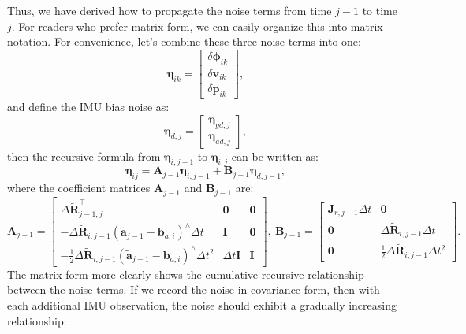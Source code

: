 Thus, we have derived how to propagate the noise terms from time $j-1$ to time $j$. For readers who prefer matrix form, we can easily organize this into matrix notation. For convenience, let's combine these three noise terms into one:
\begin{equation}\label{key}
	\boldsymbol{\eta}_{ik} = \begin{bmatrix}
		\delta \boldsymbol{\phi}_{ik} \\
		\delta \mathbf{v}_{ik} \\
		\delta \mathbf{p}_{ik}
	\end{bmatrix} ,
\end{equation}
and define the IMU bias noise as:
\begin{equation}\label{key}
	\boldsymbol{\eta}_{d,j} =\begin{bmatrix}
		\boldsymbol{\eta}_{gd, j} \\
		\boldsymbol{\eta}_{ad, j}
	\end{bmatrix},
\end{equation}
then the recursive formula from $\boldsymbol{\eta}_{i,j-1}$ to $\boldsymbol{\eta}_{i,j}$ can be written as:
\begin{equation}\label{key}
	\boldsymbol{\eta}_{ij} = \mathbf{A}_{j-1} \boldsymbol{\eta}_{i,j-1} + \mathbf{B}_{j-1} \boldsymbol{\eta}_{d,j-1},
\end{equation}
where the coefficient matrices $\mathbf{A}_{j-1}$ and $\mathbf{B}_{j-1}$ are:
\begin{equation}\label{eq:preinteg-update-cov}
	\mathbf{A}_{j-1} = \begin{bmatrix}
		\Delta \tilde{\mathbf{R}}_{j-1, j}^\top & \mathbf{0} & \mathbf{0} \\
		-\Delta \tilde{\mathbf{R}}_{i, j-1} (\tilde{\mathbf{a}}_{j-1} - \mathbf{b}_{a,i})^\wedge \Delta t & \mathbf{I} & \mathbf{0} \\
		- \frac{1}{2} \Delta \tilde{\mathbf{R}}_{i, j-1}  (\tilde{\mathbf{a}}_{j-1} - \mathbf{b}_{a,i})^\wedge \Delta t^2 & 
		\Delta t \mathbf{I} & \mathbf{I} 
	\end{bmatrix}, \ 
	\mathbf{B}_{j-1} = \begin{bmatrix}
		\mathbf{J}_{r,j-1} \Delta t & \mathbf{0} \\
		\mathbf{0} & \Delta \tilde{\mathbf{R}}_{i, j-1} \Delta t \\
		\mathbf{0} & \frac{1}{2} \Delta \tilde{\mathbf{R}}_{i,j-1} \Delta t^2 
	\end{bmatrix}.
\end{equation}
The matrix form more clearly shows the cumulative recursive relationship between the noise terms. If we record the noise in covariance form, then with each additional IMU observation, the noise should exhibit a gradually increasing relationship:
